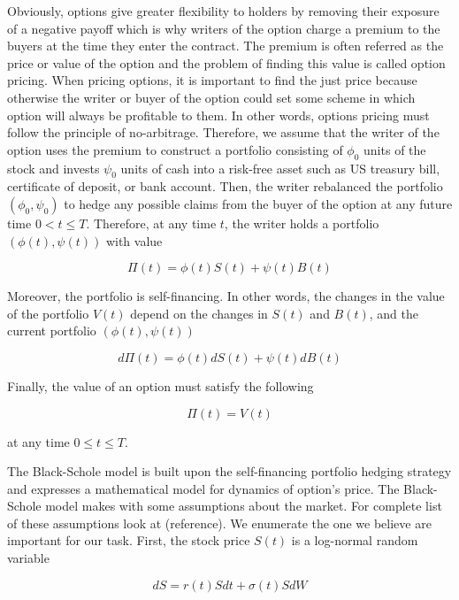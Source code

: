 Obviously, options give greater flexibility 
to holders by removing their exposure of a negative payoff which is why writers of 
the option charge a premium to the buyers at the time they enter the contract. 
The premium is often referred as the price or value of the option and the problem of finding this value is called option pricing. 
When pricing options, it is important to find the just price because 
otherwise the writer or buyer of the option could set some scheme in which option
will always be profitable to them. In other words, options pricing must follow
the principle of no-arbitrage. Therefore, we assume that the writer of the option
uses the premium to construct a portfolio consisting of $\phi_0$ units of the 
stock and invests $\psi_0$ units of cash into a risk-free asset such as US
treasury bill, certificate of deposit, or bank account. Then, the writer rebalanced
the portfolio $(\phi_0, \psi_0)$ to hedge any 
possible claims from the buyer of the option at any future time $0 < t \le T$. 
Therefore, at any time $t$, the writer holds a portfolio $(\phi(t), \psi(t))$ 
with value

\begin{equation}
  \Pi(t) = \phi(t)S(t) + \psi(t)B(t)
\end{equation}

Moreover, the portfolio is self-financing. In other words, the changes in the value
of the portfolio $V(t)$ depend on the changes in $S(t)$ and $B(t)$, and the current
portfolio $(\phi(t), \psi(t))$

\begin{equation}
  d\Pi(t) = \phi(t)dS(t) + \psi(t)dB(t)
\end{equation}

Finally, the value of an option must satisfy the following

\begin{equation}
  \Pi(t) = V(t)
\end{equation}

at any time $0 \le t \le T$.

The Black-Schole model is built upon the self-financing portfolio hedging strategy 
and expresses a mathematical model for dynamics of option's price. 
The Black-Schole model makes with some assumptions about the market. For complete
list of these assumptions look at (reference). We enumerate the one we believe 
are important for our task. First, the stock price $S(t)$ is a log-normal random
variable 

\begin{equation}
  dS = r(t)Sdt + \sigma(t) S dW
\end{equation}

